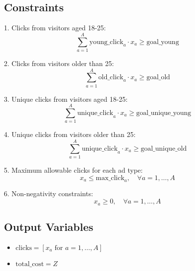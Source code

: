 \documentclass{article}
\begin{document}
\subsection*{Constraints}
1. Clicks from visitors aged 18-25:
\[
\sum_{a=1}^{A} \text{young\_click}_a \cdot x_a \geq \text{goal\_young}
\]

2. Clicks from visitors older than 25:
\[
\sum_{a=1}^{A} \text{old\_click}_a \cdot x_a \geq \text{goal\_old}
\]

3. Unique clicks from visitors aged 18-25:
\[
\sum_{a=1}^{A} \text{unique\_click}_a \cdot x_a \geq \text{goal\_unique\_young}
\]

4. Unique clicks from visitors older than 25:
\[
\sum_{a=1}^{A} \text{unique\_click}_a \cdot x_a \geq \text{goal\_unique\_old}
\]

5. Maximum allowable clicks for each ad type:
\[
x_a \leq \text{max\_click}_a, \quad \forall a = 1, \ldots, A
\]

6. Non-negativity constraints:
\[
x_a \geq 0, \quad \forall a = 1, \ldots, A
\]

\subsection*{Output Variables}
\begin{itemize}
    \item \( \text{clicks} = [x_a \text{ for } a = 1, \ldots, A] \)
    \item \( \text{total\_cost} = Z \)
\end{itemize}
\end{document}
